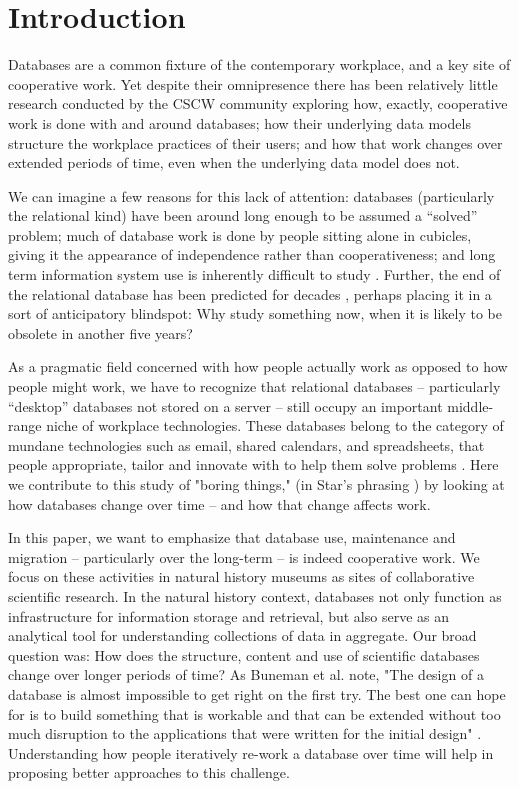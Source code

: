 \section{Introduction}

Databases are a common fixture of the contemporary workplace, and a key site of cooperative work. Yet despite their omnipresence there has been relatively little research conducted by the CSCW community exploring how, exactly, cooperative work is done with and around databases;  how their underlying data models structure the workplace practices of their users; and how that work changes over extended periods of time, even when the underlying data model does not. 

We can imagine a few reasons for this lack of attention: databases (particularly the relational kind) have been around long enough to be assumed a “solved” problem; much of database work is done by people sitting alone in cubicles, giving it the appearance of independence rather than cooperativeness; and long term information system use is inherently difficult to study \cite{Pipek_2002}. Further, the end of the relational database has been predicted for decades \cite{Atzeni_2013}, perhaps placing it in a sort of anticipatory blindspot: Why study something now, when it is likely to be obsolete in another five years? 

As a pragmatic field concerned with how people actually work as opposed to how people might work, we have to recognize that relational databases – particularly “desktop” databases not stored on a server – still occupy an important middle-range niche of workplace technologies. These databases belong to the category of mundane technologies such as email, shared calendars, and spreadsheets, that people appropriate, tailor and innovate with to help them solve problems  \cite{bellotti2005quality, palen1999social, nardi1991twinkling}. Here we contribute to this study of "boring things," (in Star's phrasing \cite{star1999ethnography}) by looking at how databases change over time -- and how that change affects work.

In this paper, we want to emphasize that database use, maintenance and migration – particularly over the long-term – is indeed cooperative work. We focus on these activities in natural history museums as sites of collaborative scientific research. In the natural history context, databases not only function as infrastructure for information storage and retrieval, but also serve as an analytical tool for understanding collections of data in aggregate. Our broad question was: How does the structure, content and use of scientific databases change over longer periods of time? As Buneman et al. note, "The design of a database is almost impossible to get right on the first try. The best one can hope for is to build something that is workable and that can be extended without too much disruption to the applications that were written for the initial design" \cite{buneman2008curated}. Understanding how people iteratively re-work a database over time will help in proposing better approaches to this challenge.

